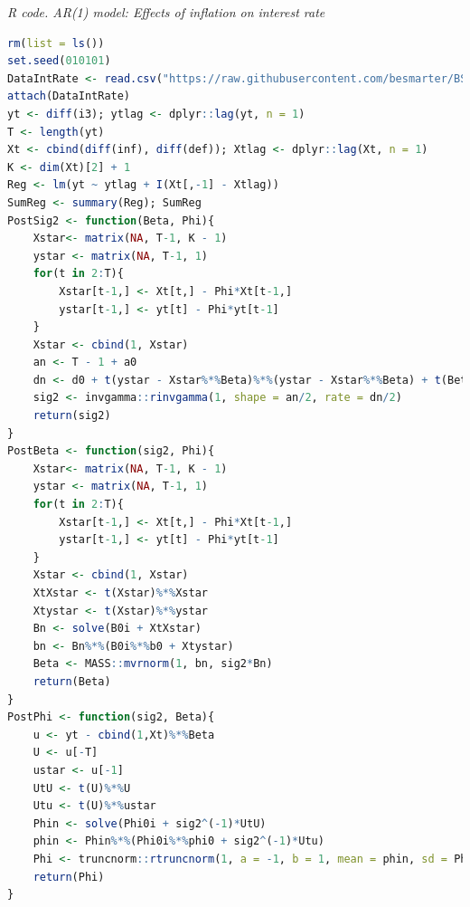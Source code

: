 \begin{tcolorbox}[enhanced,width=4.67in,center upper,
	fontupper=\large\bfseries,drop shadow southwest,sharp corners]
	\textit{R code. AR(1) model: Effects of inflation on interest rate}
	\begin{VF}
		\begin{lstlisting}[language=R]
rm(list = ls())
set.seed(010101)
DataIntRate <- read.csv("https://raw.githubusercontent.com/besmarter/BSTApp/refs/heads/master/DataApp/16INTDEF.csv", sep = ",", header = TRUE, quote = "")
attach(DataIntRate)
yt <- diff(i3); ytlag <- dplyr::lag(yt, n = 1)
T <- length(yt)
Xt <- cbind(diff(inf), diff(def)); Xtlag <- dplyr::lag(Xt, n = 1)
K <- dim(Xt)[2] + 1
Reg <- lm(yt ~ ytlag + I(Xt[,-1] - Xtlag))
SumReg <- summary(Reg); SumReg
PostSig2 <- function(Beta, Phi){
	Xstar<- matrix(NA, T-1, K - 1)
	ystar <- matrix(NA, T-1, 1)
	for(t in 2:T){
		Xstar[t-1,] <- Xt[t,] - Phi*Xt[t-1,]
		ystar[t-1,] <- yt[t] - Phi*yt[t-1]
	}
	Xstar <- cbind(1, Xstar)
	an <- T - 1 + a0
	dn <- d0 + t(ystar - Xstar%*%Beta)%*%(ystar - Xstar%*%Beta) + t(Beta - b0)%*%B0i%*%(Beta - b0)
	sig2 <- invgamma::rinvgamma(1, shape = an/2, rate = dn/2)
	return(sig2)
}
PostBeta <- function(sig2, Phi){
	Xstar<- matrix(NA, T-1, K - 1)
	ystar <- matrix(NA, T-1, 1)
	for(t in 2:T){
		Xstar[t-1,] <- Xt[t,] - Phi*Xt[t-1,]
		ystar[t-1,] <- yt[t] - Phi*yt[t-1]
	}
	Xstar <- cbind(1, Xstar)
	XtXstar <- t(Xstar)%*%Xstar
	Xtystar <- t(Xstar)%*%ystar
	Bn <- solve(B0i + XtXstar)
	bn <- Bn%*%(B0i%*%b0 + Xtystar)
	Beta <- MASS::mvrnorm(1, bn, sig2*Bn)
	return(Beta)
}
PostPhi <- function(sig2, Beta){
	u <- yt - cbind(1,Xt)%*%Beta
	U <- u[-T]
	ustar <- u[-1]
	UtU <- t(U)%*%U
	Utu <- t(U)%*%ustar
	Phin <- solve(Phi0i + sig2^(-1)*UtU)
	phin <- Phin%*%(Phi0i%*%phi0 + sig2^(-1)*Utu)
	Phi <- truncnorm::rtruncnorm(1, a = -1, b = 1, mean = phin, sd = Phin^0.5)
	return(Phi)
}
		\end{lstlisting}
	\end{VF}
\end{tcolorbox}


